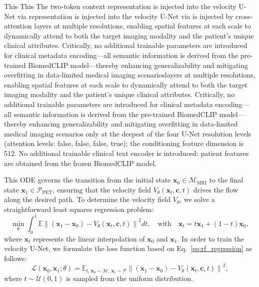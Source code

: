 \documentclass{article}
\providecommand{\DIFaddtex}[1]{{\protect\color{blue} \sf #1}} %
\providecommand{\DIFdeltex}[1]{{\protect\color{red} \ifmmode #1\else\scriptsize #1\fi}} %
\providecommand{\DIFaddbegin}{} %
\providecommand{\DIFaddend}{} %
\providecommand{\DIFdelbegin}{} %
\providecommand{\DIFdelend}{} %
\providecommand{\DIFadd}[1]{\texorpdfstring{\DIFaddtex{#1}}{#1}} %
\providecommand{\DIFdel}[1]{\texorpdfstring{\DIFdeltex{#1}}{}} %
\newcommand{\DIFscaledelfig}{0.5}
\newlength{\DIFdelgraphicswidth} %
\newlength{\DIFdelgraphicsheight} %
\newcommand{\DIFaddincludegraphics}[2][]{{\color{blue}\fbox{\DIFOincludegraphics[#1]{#2}}}} %
\newcommand{\DIFdelincludegraphics}[2][]{%
\sbox{\DIFdelgraphicsbox}{\DIFOincludegraphics[#1]{#2}}%
\settoboxwidth{\DIFdelgraphicswidth}{\DIFdelgraphicsbox} %
\settoboxtotalheight{\DIFdelgraphicsheight}{\DIFdelgraphicsbox} %
\scalebox{\DIFscaledelfig}{%
\parbox[b]{\DIFdelgraphicswidth}{\usebox{\DIFdelgraphicsbox}\\[-\baselineskip] \rule{\DIFdelgraphicswidth}{0em}}\llap{\resizebox{\DIFdelgraphicswidth}{\DIFdelgraphicsheight}{%
\setlength{\unitlength}{\DIFdelgraphicswidth}%
\begin{picture}(1,1)%
\thicklines\linethickness{2pt} %
{\color[rgb]{1,0,0}\put(0,0){\framebox(1,1){}}}%
{\color[rgb]{1,0,0}\put(0,0){\line( 1,1){1}}}%
{\color[rgb]{1,0,0}\put(0,1){\line(1,-1){1}}}%
\end{picture}%
}\hspace*{3pt}}} %
} %
\DeclareRobustCommand{\DIFaddbegin}{\DIFOaddbegin \let\includegraphics\DIFaddincludegraphics} %
\DeclareRobustCommand{\DIFaddend}{\DIFOaddend \let\includegraphics\DIFOincludegraphics} %
\DeclareRobustCommand{\DIFdelbegin}{\DIFOdelbegin \let\includegraphics\DIFdelincludegraphics} %
\DeclareRobustCommand{\DIFdelend}{\DIFOaddend \let\includegraphics\DIFOincludegraphics} %
\begin{document}
\DIFdelbegin \DIFdel{This }\DIFdelend \DIFaddbegin \DIFadd{The }\DIFaddend two-token context \DIFdelbegin \DIFdel{representation is injected into the velocity U-Net via }\DIFdelend \DIFaddbegin \DIFadd{is injected by }\DIFaddend cross-attention \DIFdelbegin \DIFdel{layers at multiple resolutions, enabling spatial features at each scale to dynamically attend to both the target imaging modality and the patient’s unique clinical attributes. Critically, no additional trainable parameters are introduced for clinical metadata encoding—all semantic information is derived from the pre-trained BiomedCLIP model—thereby enhancing generalizability and mitigating overfitting in data-limited medical imaging scenarios}\DIFdelend \DIFaddbegin \DIFadd{only at the deepest of the four U-Net resolution levels (attention levels: false, false, false, true); the conditioning feature dimension is 512. No additional trainable clinical text encoder is introduced: patient features are obtained from the frozen BiomedCLIP model}\DIFaddend .

This ODE governs the transition from the initial state $\mathbf{x}_0 \in \mathcal{M}_{\text{MRI}}$ to the final state $\mathbf{x}_1 \in \mathcal{P}_{\text{PET}}$, ensuring that the velocity field $V_\theta(\mathbf{x}_t, \mathbf{c}, t)$ drives the flow along the desired path. To determine the velocity field $V_\theta$, we solve a straightforward least squares regression problem:
\begin{equation}
\min_{\theta} \int_0^1 \mathbb{E} \left\| (\mathbf{x}_1 - \mathbf{x}_0) - V_\theta(\mathbf{x}_t, \mathbf{c}, t) \right\|^2 dt, \quad \text{with} \quad \mathbf{x}_t = t\mathbf{x}_1 + (1-t)\mathbf{x}_0,
\label{eq:rf_regression}
\end{equation}
where $\mathbf{x}_t$ represents the linear interpolation of $\mathbf{x}_0$ and $\mathbf{x}_1$. In order to train the velocity U-Net, we formulate the loss function based on Eq.~\eqref{eq:rf_regression} as follows:
\begin{equation}
\mathcal{L}(\mathbf{x}_0, \mathbf{x}_1; \theta) = \mathbb{E}_{t,\, \mathbf{x}_0 \sim \mathcal{M},\, \mathbf{x}_1 \sim \mathcal{P}} \left\| (\mathbf{x}_1 - \mathbf{x}_0) - V_\theta(\mathbf{x}_t, \mathbf{c}, t) \right\|^2,
\label{eq:rf_loss}
\end{equation}
where $t \sim \mathcal{U}(0, 1)$ is sampled from the uniform distribution.
\end{document}
